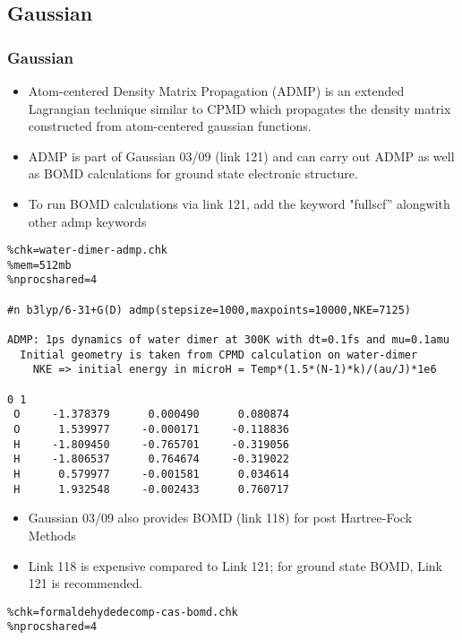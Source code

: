 \documentclass[slidestop,mathserif,compress,xcolor=svgnames]{beamer}
\newenvironment{bblock}[0]
{
\begin{beamerboxesrounded}[upper=uppercol1,lower=lowercol1,shadow=true]}
{\end{beamerboxesrounded}}
\newenvironment{eblock}[0]
{
\begin{beamerboxesrounded}[upper=uppercol2,lower=lowercol2,shadow=true]}
{\end{beamerboxesrounded}}
\begin{document}
\subsection{Gaussian}
\begin{frame}
  \frametitle{\small Gaussian}
  \begin{bblock}{}
    \begin{itemize}
    \item Atom-centered Density Matrix Propagation (ADMP) is an extended Lagrangian technique similar to CPMD which propagates the density matrix constructed from atom-centered gaussian functions.
    \item ADMP is part of Gaussian 03/09 (link 121) and can carry out ADMP as well as BOMD calculations for ground state electronic structure.
    \item To run BOMD calculations via link 121, add the keyword "fullscf'' alongwith other admp keywords
    \end{itemize}
  \end{bblock}
  \begin{eblock}{}
    {\fontsize{5}{5}
      \begin{verbatim}
%chk=water-dimer-admp.chk
%mem=512mb
%nprocshared=4

#n b3lyp/6-31+G(D) admp(stepsize=1000,maxpoints=10000,NKE=7125) 

ADMP: 1ps dynamics of water dimer at 300K with dt=0.1fs and mu=0.1amu
  Initial geometry is taken from CPMD calculation on water-dimer
	NKE => initial energy in microH = Temp*(1.5*(N-1)*k)/(au/J)*1e6
	
0 1
 O     -1.378379      0.000490      0.080874
 O      1.539977     -0.000171     -0.118836
 H     -1.809450     -0.765701     -0.319056
 H     -1.806537      0.764674     -0.319022
 H      0.579977     -0.001581      0.034614
 H      1.932548     -0.002433      0.760717

      \end{verbatim}
    }
  \end{eblock}
  \begin{bblock}{}
    \begin{itemize}
      \item Gaussian 03/09 also provides BOMD (link 118) for post Hartree-Fock Methods
      \item Link 118 is expensive compared to Link 121; for ground state BOMD, Link 121 is recommended.
    \end{itemize}
  \end{bblock}
  \begin{eblock}{}
    {\fontsize{5}{5}
      \begin{verbatim}
%chk=formaldehydedecomp-cas-bomd.chk
%nprocshared=4


\end{verbatim}}
\end{eblock}
\end{frame}
\end{document}
